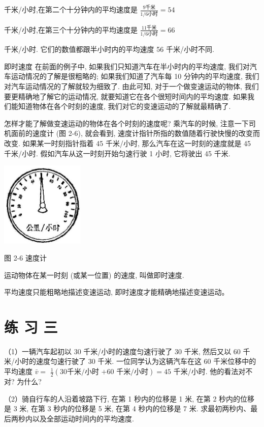 \documentclass[10pt]{article}
\begin{document}
千米/小时,在第二个十分钟内的平均速度是 \(\frac{9\text{千米}}{1/6\text{小时}} = {54}\)

千米/小时,在第三个十分钟内的平均速度是 \(\frac{{11}\text{千米}}{1/6\text{小时}} = {66}\)

千米/小时. 它们的数值都跟半小时内的平均速度 56 千米/小时不同.

即时速度 在前面的例子中, 如果我们只知道汽车在半小时内的平均速度, 我们对汽车运动情况的了解是很粗略的; 如果我们知道了汽车每 10 分钟内的平均速度, 我们对汽车运动情况的了解就较为细致了. 由此可知, 对于一个做变速运动的物体, 我们要更精确地了解它的运动情况, 就要知道它在各个很短时间内的平均速度. 如果我们能知道物体在各个时刻的速度, 我们对它的变速运动的了解就最精确了.

怎样才能了解做变速运动的物体在各个时刻的速度呢? 乘汽车的时候, 注意一下司机面前的速度计 (图 2-6), 就会看到, 速度计指针所指的数值随着行驶快慢的改变而改变. 如果某一时刻指针指着 45 千米/小时, 那么汽车在这一时刻的速度就是 45 千米/小时. 假如汽车从这一时刻开始匀速行驶 1 小时, 它将驶出 45 千米.

\begin{center}
\includegraphics[max width=0.3\textwidth]{images/01912d55-147c-70aa-b0e0-1782a122f948_64_275984.jpg}
\end{center}

图 2-6 速度计

运动物体在某一时刻 (或某一位置) 的速度, 叫做即时速度.

平均速度只能粗略地描述变速运动, 即时速度才能精确地描述变速运动。

\section*{练 习 三}

（1）一辆汽车起初以 30 千米/小时的速度匀速行驶了 30 千米, 然后又以 60 千米/小时的速度匀速行驶了 30 千米. 一位同学认为这辆汽车在这 60 千米位移中的平均速度 \(\bar{v} =\) \(\frac{1}{2}\left( {{30}\text{千米/小时 +60 千米/小时}}\right) = {45}\) 千米/小时. 他的看法对不对? 为什么?

（2）骑自行车的人沿着坡路下行, 在第 1 秒内的位移是 1 米, 在第 2 秒内的位移是 3 米, 在第 3 秒内的位移是 5 米, 在第 4 秒内的位移是 7 米. 求最初两秒内、最后两秒内以及全部运动时间内的平均速度.
\end{document}

